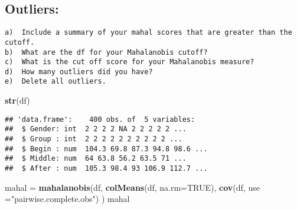 \documentclass[
]{article}
\newenvironment{Shaded}{\begin{snugshade}}{\end{snugshade}}
\newcommand{\DataTypeTok}[1]{\textcolor[rgb]{0.13,0.29,0.53}{#1}}
\newcommand{\KeywordTok}[1]{\textcolor[rgb]{0.13,0.29,0.53}{\textbf{#1}}}
\newcommand{\NormalTok}[1]{#1}
\newcommand{\OtherTok}[1]{\textcolor[rgb]{0.56,0.35,0.01}{#1}}
\newcommand{\StringTok}[1]{\textcolor[rgb]{0.31,0.60,0.02}{#1}}
\begin{document}
\hypertarget{outliers}{%
\subsection{Outliers:}\label{outliers}}

\begin{verbatim}
a)  Include a summary of your mahal scores that are greater than the cutoff.
b)  What are the df for your Mahalanobis cutoff?
c)  What is the cut off score for your Mahalanobis measure?
d)  How many outliers did you have?
e)  Delete all outliers. 
\end{verbatim}

\begin{Shaded}
\begin{Highlighting}[]
\KeywordTok{str}\NormalTok{(df)}
\end{Highlighting}
\end{Shaded}

\begin{verbatim}
## 'data.frame':    400 obs. of  5 variables:
##  $ Gender: int  2 2 2 2 NA 2 2 2 2 2 ...
##  $ Group : int  2 2 2 2 2 2 2 2 2 2 ...
##  $ Begin : num  104.3 69.8 87.3 94.8 98.6 ...
##  $ Middle: num  64 63.8 56.2 63.5 71 ...
##  $ After : num  105.3 98.4 93 106.9 112.7 ...
\end{verbatim}

\begin{Shaded}
\begin{Highlighting}[]
\NormalTok{mahal =}\StringTok{ }\KeywordTok{mahalanobis}\NormalTok{(df,}
                    \KeywordTok{colMeans}\NormalTok{(df, }\DataTypeTok{na.rm=}\OtherTok{TRUE}\NormalTok{),}
                    \KeywordTok{cov}\NormalTok{(df, }\DataTypeTok{use =}\StringTok{"pairwise.complete.obs"}\NormalTok{)}
\NormalTok{                    )}
\NormalTok{mahal}
\end{Highlighting}
\end{Shaded}
\end{document}
